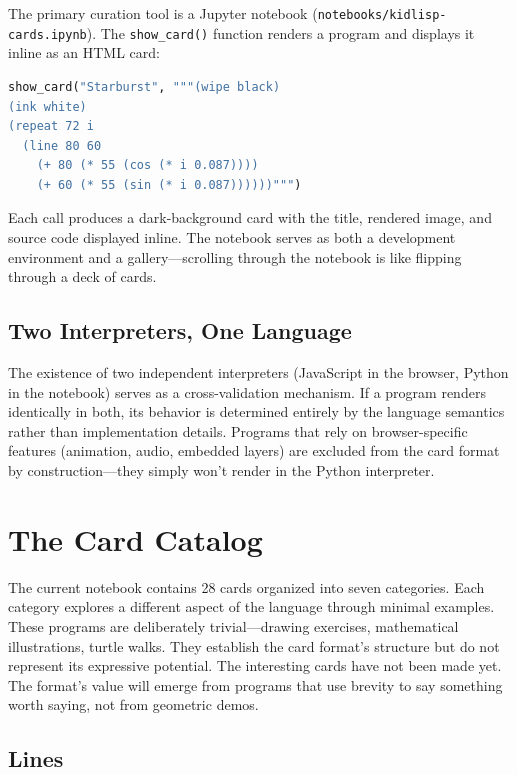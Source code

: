 \documentclass[10pt,letterpaper,twocolumn]{article}
\begin{document}
The primary curation tool is a Jupyter notebook (\texttt{notebooks/kidlisp-cards.ipynb}). The \texttt{show\_card()} function renders a program and displays it inline as an HTML card:

\begin{lstlisting}[language=python,basicstyle=\ttfamily\footnotesize]
show_card("Starburst", """(wipe black)
(ink white)
(repeat 72 i
  (line 80 60
    (+ 80 (* 55 (cos (* i 0.087))))
    (+ 60 (* 55 (sin (* i 0.087))))))""")
\end{lstlisting}

Each call produces a dark-background card with the title, rendered image, and source code displayed inline. The notebook serves as both a development environment and a gallery---scrolling through the notebook is like flipping through a deck of cards.

\subsection{Two Interpreters, One Language}

The existence of two independent interpreters (JavaScript in the browser, Python in the notebook) serves as a cross-validation mechanism. If a program renders identically in both, its behavior is determined entirely by the language semantics rather than implementation details. Programs that rely on browser-specific features (animation, audio, embedded layers) are excluded from the card format by construction---they simply won't render in the Python interpreter.


\section{The Card Catalog}
\label{sec:catalog}

The current notebook contains 28 cards organized into seven categories. Each category explores a different aspect of the language through minimal examples. These programs are deliberately trivial---drawing exercises, mathematical illustrations, turtle walks. They establish the card format's structure but do not represent its expressive potential. The interesting cards have not been made yet. The format's value will emerge from programs that use brevity to say something worth saying, not from geometric demos.

\subsection{Lines}
\end{document}
